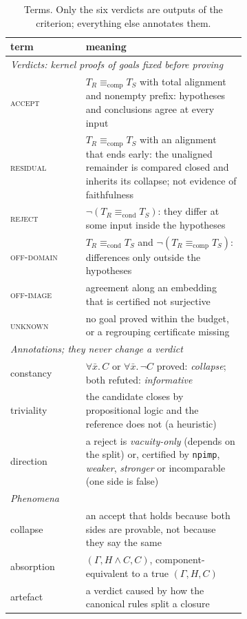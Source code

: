 \documentclass[10pt]{article}
\theoremstyle{definition}
\newcommand{\Econd}{\mathrel{\equiv_{\mathrm{cond}}}}
\newcommand{\Ecomp}{\mathrel{\equiv_{\mathrm{comp}}}}
\newcommand{\V}[1]{\textsc{#1}}
\begin{document}
\begin{table}[t]
\centering\small
\begin{tabular}{lp{0.68\linewidth}}
\toprule
term & meaning\\
\midrule
\multicolumn{2}{l}{\emph{Verdicts: kernel proofs of goals fixed before proving}}\\
\V{accept} & $T_R\Ecomp T_S$ with total alignment and nonempty prefix: hypotheses and conclusions agree at every input\\
\V{residual} & $T_R\Ecomp T_S$ with an alignment that ends early: the unaligned remainder is compared closed and inherits its collapse; not evidence of faithfulness\\
\V{reject} & $\neg(T_R\Econd T_S)$: they differ at some input inside the hypotheses\\
\V{off-domain} & $T_R\Econd T_S$ and $\neg(T_R\Ecomp T_S)$: differences only outside the hypotheses\\
\V{off-image} & agreement along an embedding that is certified not surjective\\
\V{unknown} & no goal proved within the budget, or a regrouping certificate missing\\
\midrule
\multicolumn{2}{l}{\emph{Annotations; they never change a verdict}}\\
constancy & $\forall\bar x.\,C$ or $\forall\bar x.\,\neg C$ proved: \emph{collapse}; both refuted: \emph{informative}\\
triviality & the candidate closes by propositional logic and the reference does not (a heuristic)\\
direction & a reject is \emph{vacuity-only} (depends on the split) or, certified by \texttt{npimp}, \emph{weaker}, \emph{stronger} or incomparable (one side is false)\\
\midrule
\multicolumn{2}{l}{\emph{Phenomena}}\\
collapse & an accept that holds because both sides are provable, not because they say the same\\
absorption & $(\Gamma,H\wedge C,C)$, component-equivalent to a true $(\Gamma,H,C)$\\
artefact & a verdict caused by how the canonical rules split a closure\\
\bottomrule
\end{tabular}
\caption{Terms. Only the six verdicts are outputs of the criterion; everything else annotates them.}
\label{tab:terms}
\end{table}

\end{document}
